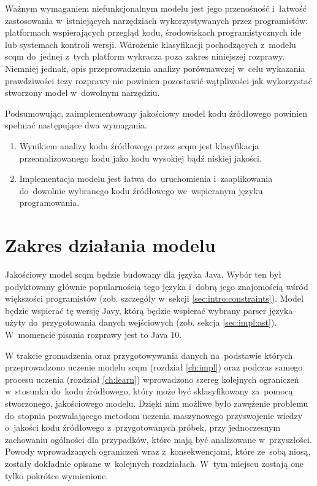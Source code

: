 \documentclass[twoside]{praca}
\begin{document}
Ważnym wymaganiem niefunkcjonalnym modelu jest jego przenośność i~łatwość zastosowania w~istniejących narzędziach wykorzystywanych przez programistów: platformach wspierających przegląd kodu, środowiskach programistycznych \gls{ide} lub systemach kontroli wersji. Wdrożenie klasyfikacji pochodzących z~modelu \gls{scqm} do~jednej z~tych platform wykracza poza zakres niniejszej rozprawy. Niemniej jednak, opis przeprowadzenia analizy porównawczej w~celu wykazania prawdziwości tezy rozprawy nie powinien pozostawić wątpliwości jak wykorzystać stworzony model w~dowolnym narzędziu.

Podsumowując, zaimplementowany jakościowy model kodu źródłowego powinien spełniać następujące dwa wymagania.

\begin{enumerate}
\item Wynikiem analizy kodu źródłowego przez \gls{scqm} jest klasyfikacja przeanalizowanego kodu jako kodu wysokiej bądź niskiej jakości.
\item Implementacja modelu jest łatwa do~uruchomienia i~zaaplikowania do~dowolnie wybranego kodu źródłowego we~wspieranym języku programowania.
\end{enumerate}

\pagebreak
\section{Zakres działania modelu}
\label{sec:proj:constraints}
Jakościowy model \gls{scqm} będzie budowany dla języka Java. Wybór ten był podyktowany głównie popularnością tego języka i~dobrą jego znajomością wśród większości programistów (zob. szczegóły w~sekcji \ref{sec:intro:constraints}). Model będzie wspierać tę wersję Javy, którą będzie wspierać wybrany parser języka użyty do~przygotowania danych wejściowych (zob. sekcja \ref{sec:impl:ast}). W~momencie pisania rozprawy jest to Java 10.

W trakcie gromadzenia oraz przygotowywania danych na~podstawie których przeprowadzono uczenie modelu \gls{scqm} (rozdział \ref{ch:impl}) oraz podczas samego procesu uczenia (rozdział \ref{ch:learn}) wprowadzono szereg kolejnych ograniczeń w~stosunku do~kodu źródłowego, który może być sklasyfikowany za~pomocą stworzonego, jakościowego modelu. Dzięki nim możliwe było zawężenie problemu do~stopnia pozwalającego metodom uczenia maszynowego przyswojenie wiedzy o~jakości kodu źródłowego z~przygotowanych próbek, przy jednoczesnym zachowaniu ogólności dla przypadków, które mają być analizowane w~przyszłości. Powody wprowadzanych ograniczeń wraz z~konsekwencjami, które ze~sobą niosą, zostały dokładnie opisane w~kolejnych rozdziałach. W~tym miejscu zostają one tylko pokrótce wymienione.
\end{document}

